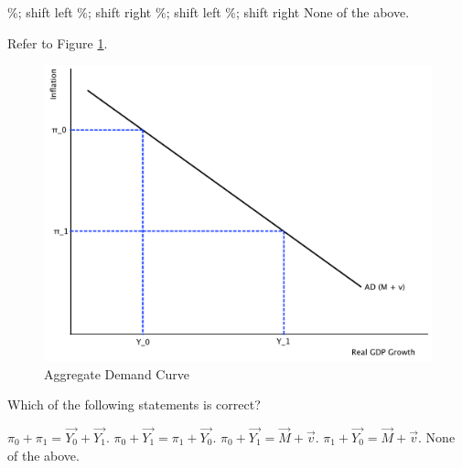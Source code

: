 \documentclass[addpoints,11pt]{exam}
\theoremstyle{definition}
\begin{document}
\begin{questions}
\begin{choices}
	\%; shift left
	\%; shift right
	\%; shift left
	\%; shift right
	\choice None of the above.
\end{choices}

\newpage

\question Refer to Figure \ref{fig2}.

\begin{figure}[H]
	\centering
	\includegraphics[scale=.40]{plot95.pdf}
	\caption{Aggregate Demand Curve}
	\label{fig2}
\end{figure}

Which of the following statements is correct?

\begin{choices}
	\choice $\pi_0 + \pi_1 = \vec{Y_0} + \vec{Y_1}$.
	\choice $\pi_0 + \vec{Y_1} = \pi_1 + \vec{Y_0}$.
	\choice $\pi_0 + \vec{Y_1} = \vec{M} + \vec{v}$.
	\choice $\pi_1 + \vec{Y_0} = \vec{M} + \vec{v}$.
	\CorrectChoice None of the above.
\end{choices}





\end{questions}
\end{document}
